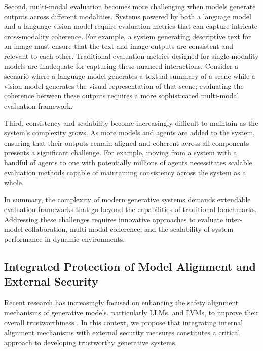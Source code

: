 Second, multi-modal evaluation becomes more challenging when models generate outputs across different modalities. Systems powered by both a language model and a language-vision model require evaluation metrics that can capture intricate cross-modality coherence. For example, a system generating descriptive text for an image must ensure that the text and image outputs are consistent and relevant to each other. Traditional evaluation metrics designed for single-modality models are inadequate for capturing these nuanced interactions. Consider a scenario where a language model generates a textual summary of a scene while a vision model generates the visual representation of that scene; evaluating the coherence between these outputs requires a more sophisticated multi-modal evaluation framework.

Third, consistency and scalability become increasingly difficult to maintain as the system's complexity grows. As more models and agents are added to the system, ensuring that their outputs remain aligned and coherent across all components presents a significant challenge. For example, moving from a system with a handful of agents \cite{chatdev, chen2024internet} to one with potentially millions of agents \cite{gu2024agent} necessitates scalable evaluation methods capable of maintaining consistency across the system as a whole.

In summary, the complexity of modern generative systems demands extendable evaluation frameworks that go beyond the capabilities of traditional benchmarks. Addressing these challenges requires innovative approaches to evaluate inter-model collaboration, multi-modal coherence, and the scalability of system performance in dynamic environments.



\subsection{Integrated Protection of Model Alignment and External Security}

Recent research has increasingly focused on enhancing the safety alignment mechanisms of generative models, particularly LLMs, and LVMs, to improve their overall trustworthiness \cite{rlhf, saferlhf, ji2024pku, yu2024rlhf, rl4f}. In this context, we propose that integrating internal alignment mechanisms with external security measures constitutes a critical approach to developing trustworthy generative systems.

